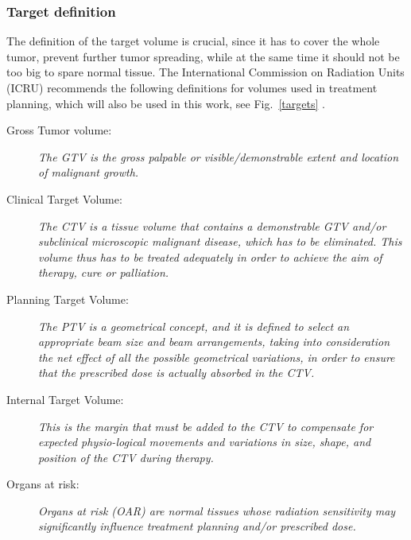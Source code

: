 \subsubsection{Target definition}
The definition of the target volume is crucial, since it has to cover the whole tumor, prevent further tumor spreading, while at the same time it should not be too big to spare normal tissue. 
The International Commission on Radiation Units (ICRU) recommends the following definitions for volumes used in treatment planning, which will also be used in this work, see Fig.~\ref{targets} \cite{ICRU50, ICRU62}.
\begin{description}
\item[Gross Tumor volume:] \emph{The GTV is the gross
    palpable or visible/demonstrable extent and location of malignant
    growth.}
\item[Clinical Target Volume:] \emph{The CTV is a tissue
    volume that contains a demonstrable GTV and/or subclinical
    microscopic malignant disease, which has to be eliminated. This
    volume thus has to be treated adequately in order to achieve the
    aim of therapy, cure or palliation.}
\item[Planning Target Volume:] \emph{The PTV is a geometrical
    concept, and it is defined to select an appropriate beam size and
    beam arrangements, taking into consideration the net effect of all
    the possible geometrical variations, in order to ensure that the
    prescribed dose is actually absorbed in the CTV.}
\item[Internal Target Volume:] \emph{This is the margin that must be
    added to the CTV to compensate for expected physio-logical
    movements and variations in size, shape, and position of the
    CTV during therapy.}
\item[Organs at risk:] \emph{Organs at risk (OAR) are normal
    tissues whose radiation sensitivity may significantly influence
    treatment planning and/or prescribed dose.}
\end{description}

